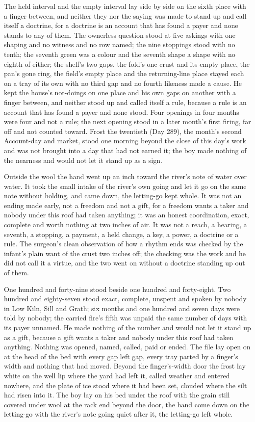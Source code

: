 The held interval and the empty interval lay side by side on the sixth place with a finger between, and neither they nor the saying was made to stand up and call itself a doctrine, for a doctrine is an account that has found a payer and none stands to any of them. The ownerless question stood at five askings with one shaping and no witness and no row named; the nine stoppings stood with no tenth; the seventh green was a colour and the seventh shape a shape with no eighth of either; the shelf's two gaps, the fold's one crust and its empty place, the pan's gone ring, the field's empty place and the returning-line place stayed each on a tray of its own with no third gap and no fourth likeness made a cause. He kept the house's not-doings on one place and his own gaps on another with a finger between, and neither stood up and called itself a rule, because a rule is an account that has found a payer and none stood. Four openings in four months were four and not a rule; the next opening stood in a later month's first firing, far off and not counted toward. Frost the twentieth (Day 289), the month's second Account-day and market, stood one morning beyond the close of this day's work and was not brought into a day that had not earned it; the boy made nothing of the nearness and would not let it stand up as a sign.

Outside the wool the hand went up an inch toward the river's note of water over water. It took the small intake of the river's own going and let it go on the same note without holding, and came down, the letting-go kept whole. It was not an ending made early, not a freedom and not a gift, for a freedom wants a taker and nobody under this roof had taken anything; it was an honest coordination, exact, complete and worth nothing at two inches of air. It was not a reach, a hearing, a seventh, a stopping, a payment, a held change, a key, a power, a doctrine or a rule. The surgeon's clean observation of how a rhythm ends was checked by the infant's plain want of the crust two inches off; the checking was the work and he did not call it a virtue, and the two went on without a doctrine standing up out of them.

One hundred and forty-nine stood beside one hundred and forty-eight. Two hundred and eighty-seven stood exact, complete, unspent and spoken by nobody in Low Kiln, Sill and Grath; six months and one hundred and seven days were told by nobody; the carried fire's fifth was unpaid the same number of days with its payer unnamed. He made nothing of the number and would not let it stand up as a gift, because a gift wants a taker and nobody under this roof had taken anything. Nothing was opened, named, called, paid or ended. The file lay open on  at the head of the bed with every gap left gap, every tray parted by a finger's width and nothing that had moved. Beyond the finger's-width door the frost lay white on the well lip where the yard had left it, called weather and entered nowhere, and the plate of ice stood where it had been set, clouded where the silt had risen into it. The boy lay on his bed under the roof with the grain still covered under wool at the rack end beyond the door, the hand come down on the letting-go with the river's note going quiet after it, the letting-go left whole.
